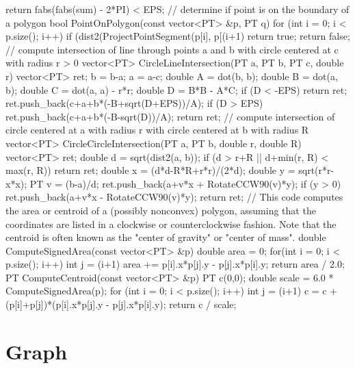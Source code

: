 \documentclass[a4paper, landscape]{article}
\begin{document}
\begin{multicols*}{2}
\begin{cppcode}
{		return fabs(fabs(sum) - 2*PI) < EPS;
		}
		// determine if point is on the boundary of a polygon
		bool PointOnPolygon(const vector<PT> &p, PT q) {
		for (int i = 0; i < p.size(); i++)
		if (dist2(ProjectPointSegment(p[i], p[(i+1)%
		return true;
		return false;
		}
		// compute intersection of line through points a and b with circle centered at c with radius r > 0
		vector<PT> CircleLineIntersection(PT a, PT b, PT c, double r) {
				vector<PT> ret;
				b = b-a;
				a = a-c;
				double A = dot(b, b);
				double B = dot(a, b);
				double C = dot(a, a) - r*r;
				double D = B*B - A*C;
				if (D < -EPS) return ret;
				ret.push_back(c+a+b*(-B+sqrt(D+EPS))/A);
				if (D > EPS)
				ret.push_back(c+a+b*(-B-sqrt(D))/A);
				return ret;
			}
		// compute intersection of circle centered at a with radius r with circle centered at b with radius R
		vector<PT> CircleCircleIntersection(PT a, PT b, double r, double R) {
				vector<PT> ret;
				double d = sqrt(dist2(a, b));
				if (d > r+R || d+min(r, R) < max(r, R)) return ret;
				double x = (d*d-R*R+r*r)/(2*d);
				double y = sqrt(r*r-x*x);
				PT v = (b-a)/d;
				ret.push_back(a+v*x + RotateCCW90(v)*y);
				if (y > 0)
				ret.push_back(a+v*x - RotateCCW90(v)*y);
				return ret;
			}
		// This code computes the area or centroid of a (possibly nonconvex) polygon, assuming that the coordinates are listed in a clockwise or counterclockwise fashion. Note that the centroid is often known as the "center of gravity" or "center of mass".
		double ComputeSignedArea(const vector<PT> &p) {
		double area = 0;
		for(int i = 0; i < p.size(); i++) {
		int j = (i+1) %
		area += p[i].x*p[j].y - p[j].x*p[i].y;
		}
		return area / 2.0;
		}
		PT ComputeCentroid(const vector<PT> &p) {
		PT c(0,0);
		double scale = 6.0 * ComputeSignedArea(p);
		for (int i = 0; i < p.size(); i++){
		int j = (i+1) %
		c = c + (p[i]+p[j])*(p[i].x*p[j].y - p[j].x*p[i].y);
		}
		return c / scale;
		}
	\end{cppcode}

	\section{Graph}


\end{multicols*}
\end{document}
